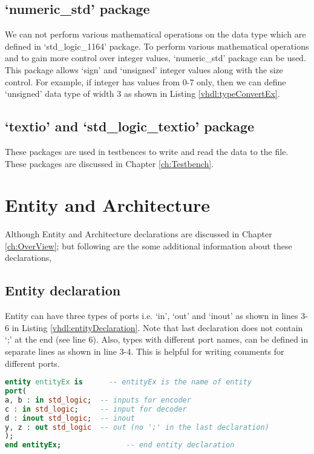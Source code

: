 \subsection{`numeric\_std' package}
We can not perform various mathematical operations on the data type which are defined in `std\_logic\_1164' package. To perform various mathematical operations and to gain more control over integer values, `numeric\_std' package can be used. This package allows `sign' and `unsigned' integer values along with the size control. For example, if integer has values from 0-7 only, then we can define `unsigned' data type of width 3 as shown in Listing \ref{vhdl:typeConvertEx}.

\subsection{`textio' and `std\_logic\_textio' package} 
These packages are used in testbences to write and read the data to the file. These packages are discussed in Chapter \ref{ch:Testbench}.

\section{Entity and Architecture}
Although Entity and Architecture declarations are discussed in Chapter \ref{ch:OverView}; but following are the some additional information about these declarations, 

\subsection{Entity declaration}
Entity can have three types of ports i.e. `in', `out' and `inout' as shown in lines 3-6 in Listing \ref{vhdl:entityDeclaration}. Note that last declaration does not contain `;' at the end (see line 6). Also, types with different port names, can be defined in separate lines as shown in line 3-4. This is helpful for writing comments for different ports. 
\begin{lstlisting}[language=Vhdl, caption=Entity Declaration, label= {vhdl:entityDeclaration}]
entity entityEx is      -- entityEx is the name of entity
port(
a, b : in std_logic;  -- inputs for encoder
c : in std_logic;     -- input for decoder
d : inout std_logic;  -- inout
y, z : out std_logic  -- out (no ';' in the last declaration)
); 
end entityEx; 			    -- end entity declaration 
\end{lstlisting}

